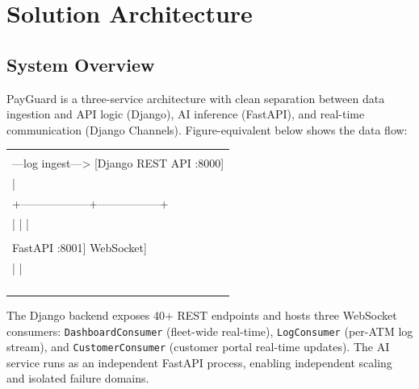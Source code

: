 \documentclass[11pt,a4paper]{article}
\begin{document}
\section{Solution Architecture}

\subsection{System Overview}

PayGuard is a three-service architecture with clean separation between data ingestion and API logic (Django), AI inference (FastAPI), and real-time communication (Django Channels). Figure-equivalent below shows the data flow:

\begin{center}
\small\ttfamily
\begin{tabular}{@{}l@{}}
\toprule
\\[-4pt]
[ATM Fleet / Payment Channels] ---log ingest---> [Django REST API :8000] \\[4pt]
\quad\quad\quad\quad\quad\quad\quad\quad\quad\quad\quad\quad\quad\quad\quad\quad\quad\quad\quad |                              \\[2pt]
\quad\quad\quad\quad\quad\quad\quad\quad +------------------+-----------------+  \\[2pt]
\quad\quad\quad\quad\quad\quad\quad\quad |                  |                 |  \\[2pt]
\quad\quad\quad [AI Service           [Django Channels   [SQLite DB]         \\[2pt]
\quad\quad\quad  FastAPI :8001]        WebSocket]                             \\[2pt]
\quad\quad\quad\quad\quad |                  |                                \\[2pt]
\quad\quad{}                          \\[2pt]
\quad\quad\quad [Prediction ]     [Dashboard +      ]                         \\[2pt]
\quad\quad{}                         \\[2pt]
\quad\quad\quad [Fraud      ]                                                  \\[4pt]
\bottomrule
\end{tabular}
\end{center}

The Django backend exposes 40+ REST endpoints and hosts three WebSocket consumers: \texttt{DashboardConsumer} (fleet-wide real-time), \texttt{LogConsumer} (per-ATM log stream), and \texttt{CustomerConsumer} (customer portal real-time updates). The AI service runs as an independent FastAPI process, enabling independent scaling and isolated failure domains.
\end{document}

